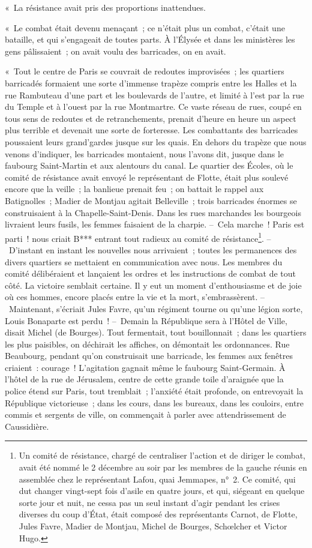 \documentclass[french,twoside]{book} %
\begin{document}
« La résistance avait pris des proportions inattendues.\par
« Le combat était devenu menaçant ; ce n’était plus un combat, c’était une bataille, et qui s’engageait de toutes parts. À l’Élysée et dans les ministères les gens pâlissaient ; on avait voulu des barricades, on en avait.\par
« Tout le centre de Paris se couvrait de redoutes improvisées ; les quartiers barricadés formaient une sorte d’immense trapèze compris entre les Halles et la rue Rambuteau d’une part et les boulevards de l’autre, et limité à l’est par la rue du Temple et à l’ouest par la rue Montmartre. Ce vaste réseau de rues, coupé en tous sens de redoutes et de retranchements, prenait d’heure en heure un aspect plus terrible et devenait une sorte de forteresse. Les combattants des barricades poussaient leurs grand’gardes jusque sur les quais. En dehors du trapèze que nous venons d’indiquer, les barricades montaient, nous l’avons dit, jusque dans le faubourg Saint-Martin et aux alentours du canal. Le quartier des Écoles, où le comité de résistance avait envoyé le représentant de Flotte, était plus soulevé encore que la veille ; la banlieue prenait feu ; on battait le rappel aux Batignolles ; Madier de Montjau agitait Belleville ; trois barricades énormes se construisaient à la Chapelle-Saint-Denis. Dans les rues marchandes les bourgeois livraient leurs fusils, les femmes faisaient de la charpie. – Cela marche ! Paris est parti ! nous criait B*** entrant tout radieux au comité de résistance\footnote{Un comité de résistance, chargé de centraliser l’action et de diriger le combat, avait été nommé le 2 décembre au soir par les membres de la gauche réunis en assemblée chez le représentant Lafou, quai Jemmapes, n° 2. Ce comité, qui dut changer vingt-sept fois d’asile en quatre jours, et qui, siégeant en quelque sorte jour et nuit, ne cessa pas un seul instant d’agir pendant les crises diverses du coup d’État, était composé des représentants Carnot, de Flotte, Jules Favre, Madier de Montjau, Michel de Bourges, Schœlcher et Victor Hugo.}. – D’instant en instant les nouvelles nous arrivaient ; toutes les permanences des divers quartiers se mettaient en communication avec nous. Les membres du comité délibéraient et lançaient les ordres et les instructions de combat de tout côté. La victoire semblait certaine. Il y eut un moment d’enthousiasme et de joie où ces hommes, encore placés entre la vie et la mort, s’embrassèrent. – Maintenant, s’écriait Jules Favre, qu’un régiment tourne ou qu’une légion sorte, Louis Bonaparte est perdu ! – Demain la République sera à l’Hôtel de Ville, disait Michel (de Bourges). Tout fermentait, tout bouillonnait ; dans les quartiers les plus paisibles, on déchirait les affiches, on démontait les ordonnances. Rue Beaubourg, pendant qu’on construisait une barricade, les femmes aux fenêtres criaient : courage ! L’agitation gagnait même le faubourg Saint-Germain. À l’hôtel de la rue de Jérusalem, centre de cette grande toile d’araignée que la police étend sur Paris, tout tremblait ; l’anxiété était profonde, on entrevoyait la République victorieuse ; dans les cours, dans les bureaux, dans les couloirs, entre commis et sergents de ville, on commençait à parler avec attendrissement de Caussidière.\par
\end{document}
